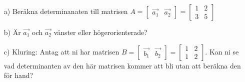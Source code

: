 \begin{itemize}
	\item[a) ] Beräkna determinanaten till matrisen $A = \begin{bmatrix} \vec{a_1} & \vec{a_2}\end{bmatrix} =\begin{bmatrix}1 & 2 \\ 3 & 5\end{bmatrix}$
	\item[b) ] Är $\vec{a_1}$ och $\vec{a_2}$ vänster eller högerorienterade?
	\item[c) ] Kluring: Antag att ni har matrisen $B = \begin{bmatrix} \vec{b_1} & \vec{b_2}\end{bmatrix} =\begin{bmatrix}1 & 2 \\ 1 & 2\end{bmatrix}$. Kan ni se vad determinanten av den här matrisen kommer att bli utan att beräkna den för hand?
\end{itemize}